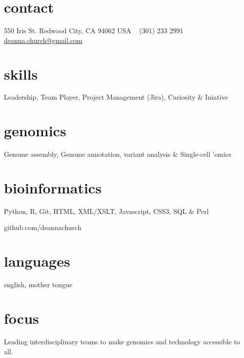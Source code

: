 \documentclass[]{dmc-cv} %
\begin{document}


\begin{aside} %
\section{contact}
550 Iris St.
Redwood City, CA 94062
USA
~
(301) 233 2991
~
\href{mailto:deanna.church@gmail.com}{deanna.church@gmail.com}
\section{skills}
Leadership, Team Player,
Project Management (Jira),
Curiosity \& Iniative
\section{genomics}
Genome assembly,
Genome annotation,
variant analysis \&
Single-cell 'omics
\section{bioinformatics}
Python, R, Git,
HTML, XML/XSLT, Javascript,
CSS3, SQL \& Perl

github.com/deannachurch

\section{languages}
english, mother tongue
\end{aside}

\section{focus}
Leading interdisciplinary teams to make genomics and technology accessible to all.

\end{document}
